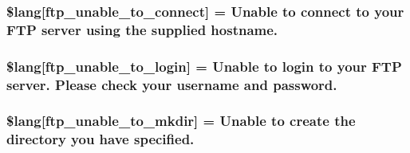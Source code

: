 \subsubsection[{\$lang}]{\setlength{\rightskip}{0pt plus 5cm}\$lang\mbox{[}\textquotesingle{}ftp\+\_\+unable\+\_\+to\+\_\+connect\textquotesingle{}\mbox{]} = \textquotesingle{}Unable to connect to your F\+T\+P server using the supplied hostname.\textquotesingle{}}\label{_admin_2system_2language_2english_2ftp__lang_8php_a57d51cf019dd2e380b84c6e31cda0cf5}
\hypertarget{_admin_2system_2language_2english_2ftp__lang_8php_affe13cbf898e1802abb3cd9d9ce2db97}{}
\subsubsection[{\$lang}]{\setlength{\rightskip}{0pt plus 5cm}\$lang\mbox{[}\textquotesingle{}ftp\+\_\+unable\+\_\+to\+\_\+login\textquotesingle{}\mbox{]} = \textquotesingle{}Unable to login to your F\+T\+P server. Please check your username and password.\textquotesingle{}}\label{_admin_2system_2language_2english_2ftp__lang_8php_affe13cbf898e1802abb3cd9d9ce2db97}
\hypertarget{_admin_2system_2language_2english_2ftp__lang_8php_acd954089043ea7ad47397376e2630d87}{}
\subsubsection[{\$lang}]{\setlength{\rightskip}{0pt plus 5cm}\$lang\mbox{[}\textquotesingle{}ftp\+\_\+unable\+\_\+to\+\_\+mkdir\textquotesingle{}\mbox{]} = \textquotesingle{}Unable to create the directory you have specified.\textquotesingle{}}\label{_admin_2system_2language_2english_2ftp__lang_8php_acd954089043ea7ad47397376e2630d87}
\hypertarget{_admin_2system_2language_2english_2ftp__lang_8php_a2e8eab1a2d2d33cde249097df270b7df}{}
